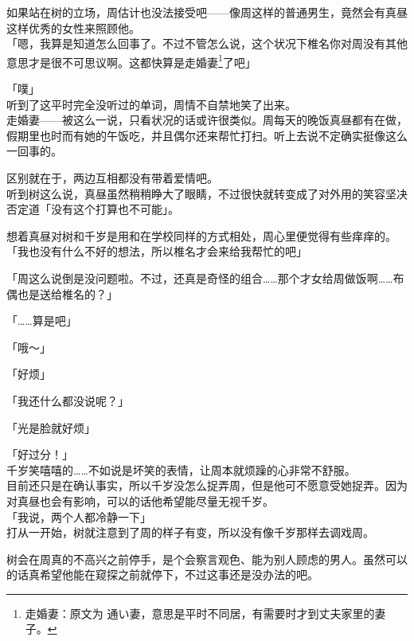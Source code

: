 如果站在树的立场，周估计也没法接受吧——像周这样的普通男生，竟然会有真昼这样优秀的女性来照顾他。\\

「嗯，我算是知道怎么回事了。不过不管怎么说，这个状况下椎名你对周没有其他意思才是很不可思议啊。这都快算是走婚妻\footnote{走婚妻：原文为 {\jpfont 通い妻}，意思是平时不同居，有需要时才到丈夫家里的妻子。}了吧」

「噗」\\

听到了这平时完全没听过的单词，周情不自禁地笑了出来。\\

走婚妻——被这么一说，只看状况的话或许很类似。周每天的晚饭真昼都有在做，假期里也时而有她的午饭吃，并且偶尔还来帮忙打扫。听上去说不定确实挺像这么一回事的。

区别就在于，两边互相都没有带着爱情吧。\\

听到树这么说，真昼虽然稍稍睁大了眼睛，不过很快就转变成了对外用的笑容坚决否定道「没有这个打算也不可能」。

想着真昼对树和千岁是用和在学校同样的方式相处，周心里便觉得有些痒痒的。\\

「我也没有什么不好的想法，所以椎名才会来给我帮忙的吧」

「周这么说倒是没问题啦。不过，还真是奇怪的组合……那个才女给周做饭啊……布偶也是送给椎名的？」

「……算是吧」

「哦～」

「好烦」

「我还什么都没说呢？」

「光是脸就好烦」

「好过分！」\\

千岁笑嘻嘻的……不如说是坏笑的表情，让周本就烦躁的心非常不舒服。\\

目前还只是在确认事实，所以千岁没怎么捉弄周，但是他可不愿意受她捉弄。因为对真昼也会有影响，可以的话他希望能尽量无视千岁。\\

「我说，两个人都冷静一下」\\

打从一开始，树就注意到了周的样子有变，所以没有像千岁那样去调戏周。

树会在周真的不高兴之前停手，是个会察言观色、能为别人顾虑的男人。虽然可以的话真希望他能在窥探之前就停下，不过这事还是没办法的吧。\\

